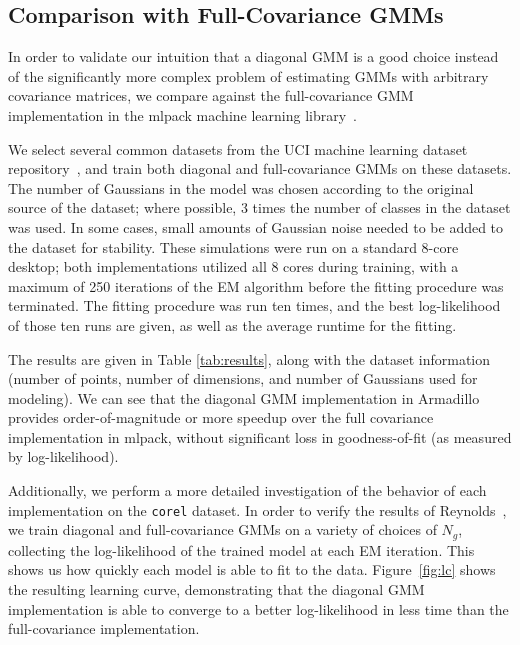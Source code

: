 \subsection{Comparison with Full-Covariance GMMs}


In order to validate our intuition that a diagonal GMM is a good choice instead
of the significantly more complex problem of estimating GMMs with arbitrary
covariance matrices, we compare against the full-covariance GMM implementation
in the mlpack machine learning library~\cite{Curtin_2013}.

We select several common datasets from the UCI machine learning dataset
repository~\cite{Lichman_2013}, and train both diagonal and full-covariance
GMMs on these datasets.  The number of Gaussians in the model was chosen
according to the original source of the dataset; where possible, 3 times the
number of classes in the dataset was used.  In some cases, small amounts of
Gaussian noise needed to be added to the dataset for stability.
These simulations were run on a standard 8-core desktop; both implementations
utilized all 8 cores during training, with a maximum of 250 iterations of the EM
algorithm before the fitting procedure was terminated.  The fitting procedure
was run ten times, and the best log-likelihood of those ten runs are given, as
well as the average runtime for the fitting.

The results are given in Table \ref{tab:results}, along with the dataset
information (number of points, number of dimensions, and number of Gaussians
used for modeling).  We can see that the diagonal GMM implementation in
Armadillo provides order-of-magnitude or more speedup over the full covariance
implementation in mlpack, without significant loss in goodness-of-fit (as
measured by log-likelihood).

Additionally, we perform a more detailed investigation of the behavior of each
implementation on the {\tt corel} dataset.  In order to verify the results of
Reynolds~\cite{Reynolds_2000}, we train diagonal and full-covariance GMMs on a
variety of choices of $N_g$, collecting the log-likelihood of the trained model
at each EM iteration.  This shows us how quickly each model is able to fit to
the data.  Figure~\ref{fig:lc} shows the resulting learning curve, demonstrating
that the diagonal GMM implementation is able to converge to a better
log-likelihood in less time than the full-covariance implementation.

